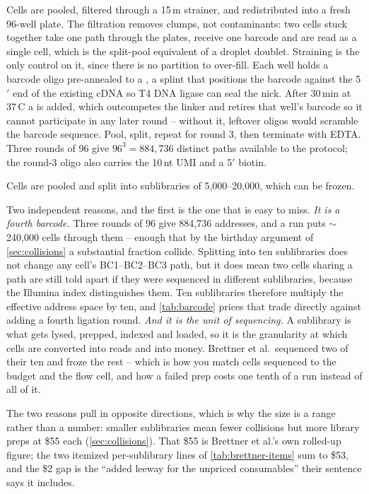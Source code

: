  Cells are pooled, filtered
through a 15\,\textmu m strainer, and redistributed into a fresh 96-well plate.
The filtration removes clumps, not contaminants: two cells stuck together take
one path through the plates, receive one barcode and are read as a single cell,
which is the split-pool equivalent of a droplet doublet. Straining is the only
control on it, since there is no partition to over-fill. Each well holds a barcode oligo
pre-annealed to a , a splint that positions the barcode
against the 5$'$ end of the existing cDNA so T4 DNA ligase can seal the nick.
After 30\,min at 37\,\textdegree C a  is added, which
outcompetes the linker and retires that well's barcode so it cannot participate
in any later round -- without it, leftover oligos would scramble the barcode
sequence. Pool, split, repeat for round 3, then terminate with EDTA. Three rounds
of 96 give $96^3=884{,}736$ distinct paths available to the protocol; the
round-3 oligo also carries the
10\,nt UMI and a 5$'$ biotin.

 Cells are pooled and split
into sublibraries of 5{,}000--20{,}000, which can be frozen.

 Two independent reasons, and the first is the
one that is easy to miss. \emph{It is a fourth barcode.} Three rounds of 96 give
884{,}736 addresses, and a run puts $\sim$240{,}000 cells through them -- enough
that by the birthday argument of \cref{sec:collisions} a substantial fraction
collide. Splitting into ten sublibraries does not change any cell's
BC1--BC2--BC3 path, but it does mean two cells sharing a path are still told apart
if they were sequenced in different sublibraries, because the Illumina index
distinguishes them. Ten sublibraries therefore multiply the effective address
space by ten, and \cref{tab:barcode} prices that trade directly against adding a
fourth ligation round. \emph{And it is the unit of sequencing.} A sublibrary is
what gets lysed, prepped, indexed and loaded, so it is the granularity at which
cells are converted into reads and into money. Brettner et al.\ sequenced two of
their ten and froze the rest -- which is how you match cells sequenced to the
budget and the flow cell, and how a failed prep costs one tenth of a run instead
of all of it.

The two reasons pull in opposite directions, which is why the size is a range
rather than a number: smaller sublibraries mean fewer collisions but more library
preps at \$55 each (\cref{sec:collisions}). That \$55 is Brettner et al.'s own
rolled-up figure; the two itemized per-sublibrary lines of
\cref{tab:brettner-items} sum to \$53, and the \$2 gap is the ``added leeway for
the unpriced consumables'' their sentence says it includes.

